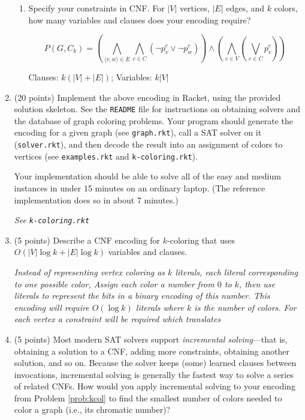 \documentclass{article}
\newenvironment{solution}{\color{blue} \em }{}
\begin{document}
\begin{enumerate}
\begin{enumerate}
\item Specify your constraints in CNF.  For $|V|$ vertices, $|E|$ edges, and $k$ colors, how many variables and clauses does your encoding require?

\begin{solution}

$$
		P(G,C_k) = (\bigwedge_{\langle v, w \rangle \in E} \bigwedge_{c \in C} (\neg p_v^c \lor \neg p_w^c))
		          \land (\bigwedge_{v \in V} (\bigvee_{c \in C} p^c_v))
$$


     Clauses: $ k(|V| + |E|)$;
     Variables: $k|V|$

\end{solution}


\end{enumerate} \label{prob:encoding}

\item (20 points) \label{prob:kcol} Implement the above encoding in Racket, using the provided solution skeleton.  See the \texttt{README} file for instructions on obtaining solvers and the database of graph coloring problems.  Your program should generate the encoding for a given graph (see \texttt{graph.rkt}), call a SAT solver on it (\texttt{solver.rkt}), and then decode the result into an assignment of colors to vertices  (see \texttt{examples.rkt} and \texttt{k-coloring.rkt}).

Your implementation should be able to solve all of the easy and medium instances in under 15 minutes on an ordinary laptop.
(The reference implementation does so in about 7 minutes.)

\begin{solution}
	See \texttt{k-coloring.rkt}
\end{solution}

\item (5 points) Describe a CNF encoding for $k$-coloring that uses $O(|V|\log k+|E|\log k)$ variables and clauses.

\begin{solution}
    Instead of representing vertex coloring as $k$ literals, each literal corresponding to one possible color, Assign each color a number from $0$ to $k$, then use literals to represent the bits in a binary encoding of this number. This encoding will require $O(\log k)$ literals where $k$ is the number of colors. For each vertex a constraint will be required which translates
\end{solution}

\item (5 points) Most modern SAT solvers support \emph{incremental solving}---that is, obtaining a solution to a CNF, adding more constraints, obtaining another solution, and so on.  Because the solver keeps (some) learned clauses between invocations, incremental solving is  generally the fastest way to solve a series of related CNFs.  How would you apply incremental solving to your encoding from Problem \ref{prob:kcol} to find the smallest number of colors needed to color a graph (i.e., its chromatic number)?  \label{prob:last}


\end{enumerate}
\end{document}

